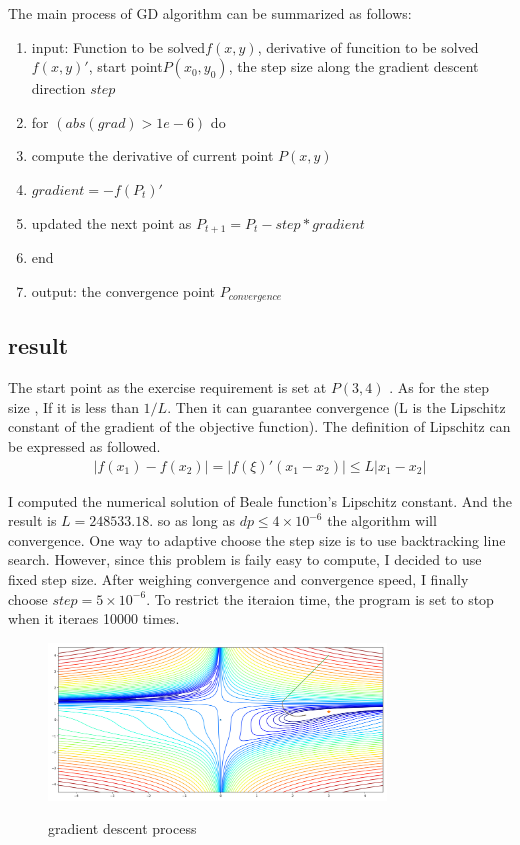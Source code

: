 \documentclass[aps,letterpaper,10pt]{article}
\begin{document}
The main process of GD algorithm can be summarized as follows:

\begin{enumerate}
	\item input: Function to be solved$f(x,y)$, derivative of funcition to be solved${f(x,y)}'$, start point$P(x_0,y_0)$, the step size along the gradient descent direction $step$
	\item for $(abs(grad)> 1e-6)$ do
	\item compute the derivative of current point $P(x,y)$
  \item $gradient = -{f(P_t)}'$
	\item updated the next point as $P_{t+1}=P_t - step*gradient$
  \item end
	\item output: the convergence point $P_{convergence}$
\end{enumerate}


\subsection{result}
The start point as the exercise requirement is set at $P(3,4)$ . As for the step size , If it is less than $1 / L$. Then it can guarantee convergence (L is the Lipschitz constant of the gradient of the objective function). The definition of Lipschitz can be expressed as followed.
\begin{align*}
  |f(x_1)-f(x_2)| = |{f(\xi)}'(x_1-x_2)| \leq L|x_1-x_2|
\end{align*}

I computed the numerical solution of Beale function's Lipschitz constant. And the result is $L=248533.18$. so as long as $dp \leq4\times10^{-6} $ the algorithm will convergence. One way to adaptive choose the step size is to use backtracking line search. However, since this problem is faily easy to compute, I decided to use fixed step size. After weighing convergence and convergence speed, I finally choose $step = 5\times10^{-6} $. To restrict the iteraion time, the program is set to stop when it iteraes 10000 times.

	\begin{figure}[H]
	  \centering
	  \label{fig:gd}\includegraphics[width=0.8\textwidth]{gd.png}\
	  \caption{gradient descent process}
	\end{figure}
\end{document}
